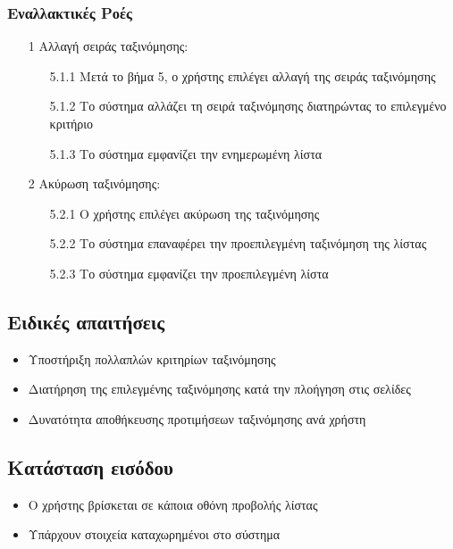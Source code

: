 \documentclass[12pt,a4paper,twoside]{book}
\begin{document}
\subsubsection{Εναλλακτικές Ροές}
\begin{enumerate}
  \item[1 ] Αλλαγή σειράς ταξινόμησης:
        \begin{enumerate}
          \item[5.1.1 ] Μετά το βήμα 5, ο χρήστης επιλέγει αλλαγή της σειράς ταξινόμησης %
          \item[5.1.2 ] Το σύστημα αλλάζει τη σειρά ταξινόμησης διατηρώντας το επιλεγμένο κριτήριο %
          \item[5.1.3 ] Το σύστημα εμφανίζει την ενημερωμένη λίστα
        \end{enumerate}
  \item[2 ] Ακύρωση ταξινόμησης:
        \begin{enumerate}
          \item[5.2.1 ] Ο χρήστης επιλέγει ακύρωση της ταξινόμησης
          \item[5.2.2 ] Το σύστημα επαναφέρει την προεπιλεγμένη ταξινόμηση της λίστας
          \item[5.2.3 ] Το σύστημα εμφανίζει την προεπιλεγμένη λίστα
        \end{enumerate}
\end{enumerate}

\subsection{Ειδικές απαιτήσεις} %
\begin{itemize}
  \item Υποστήριξη πολλαπλών κριτηρίων ταξινόμησης
  \item Διατήρηση της επιλεγμένης ταξινόμησης κατά την πλοήγηση στις σελίδες %
  \item Δυνατότητα αποθήκευσης προτιμήσεων ταξινόμησης ανά χρήστη
\end{itemize}

\subsection{Κατάσταση εισόδου} %
\begin{itemize}
  \item Ο χρήστης βρίσκεται σε κάποια οθόνη προβολής λίστας
  \item Υπάρχουν στοιχεία καταχωρημένοι στο σύστημα
\end{itemize}
\end{document}
